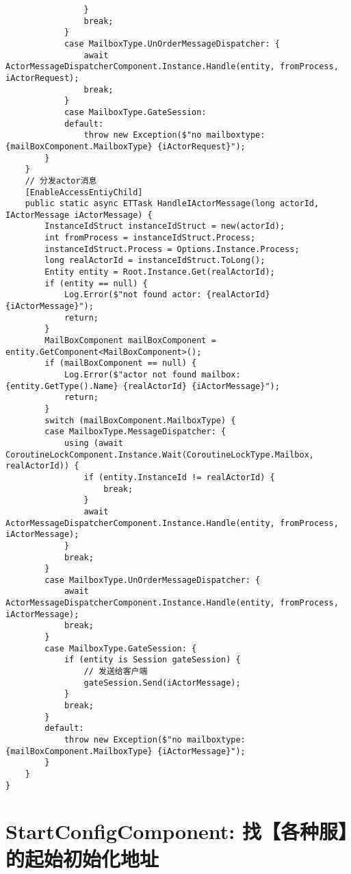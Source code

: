 \documentclass[9pt, b5paper]{article}
\begin{document}
\begin{verbatim}
                }
                break;
            }
            case MailboxType.UnOrderMessageDispatcher: {
                await ActorMessageDispatcherComponent.Instance.Handle(entity, fromProcess, iActorRequest);
                break;
            }
            case MailboxType.GateSession:
            default:
                throw new Exception($"no mailboxtype: {mailBoxComponent.MailboxType} {iActorRequest}");
        }
    }
    // 分发actor消息
    [EnableAccessEntiyChild]
    public static async ETTask HandleIActorMessage(long actorId, IActorMessage iActorMessage) {
        InstanceIdStruct instanceIdStruct = new(actorId);
        int fromProcess = instanceIdStruct.Process;
        instanceIdStruct.Process = Options.Instance.Process;
        long realActorId = instanceIdStruct.ToLong();
        Entity entity = Root.Instance.Get(realActorId);
        if (entity == null) {
            Log.Error($"not found actor: {realActorId} {iActorMessage}");
            return;
        }
        MailBoxComponent mailBoxComponent = entity.GetComponent<MailBoxComponent>();
        if (mailBoxComponent == null) {
            Log.Error($"actor not found mailbox: {entity.GetType().Name} {realActorId} {iActorMessage}");
            return;
        }
        switch (mailBoxComponent.MailboxType) {
        case MailboxType.MessageDispatcher: {
            using (await CoroutineLockComponent.Instance.Wait(CoroutineLockType.Mailbox, realActorId)) {
                if (entity.InstanceId != realActorId) {
                    break;
                }
                await ActorMessageDispatcherComponent.Instance.Handle(entity, fromProcess, iActorMessage);
            }
            break;
        }
        case MailboxType.UnOrderMessageDispatcher: {
            await ActorMessageDispatcherComponent.Instance.Handle(entity, fromProcess, iActorMessage);
            break;
        }
        case MailboxType.GateSession: {
            if (entity is Session gateSession) {
                // 发送给客户端
                gateSession.Send(iActorMessage);
            }
            break;
        }
        default:
            throw new Exception($"no mailboxtype: {mailBoxComponent.MailboxType} {iActorMessage}");
        }
    }
}
\end{verbatim}


\section{StartConfigComponent: 找【各种服】的起始初始化地址}
\label{sec-2}
\end{document}
